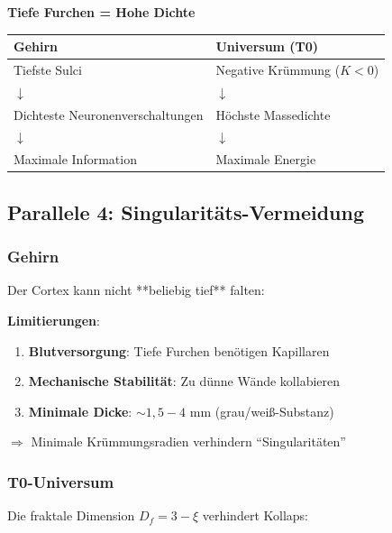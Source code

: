 	\begin{keyresult}
		\textbf{Tiefe Furchen = Hohe Dichte}
		
		\vspace{0.3cm}
		
		\begin{center}
			\begin{tabular}{p{4cm}|p{4cm}}
				\toprule
				\textbf{Gehirn} & \textbf{Universum (T0)} \\
				\midrule
				Tiefste Sulci & Negative Krümmung ($K<0$) \\
				$\downarrow$ & $\downarrow$ \\
				Dichteste Neuronenverschaltungen & Höchste Massedichte \\
				$\downarrow$ & $\downarrow$ \\
				Maximale Information & Maximale Energie \\
				\bottomrule
			\end{tabular}
		\end{center}
	\end{keyresult}
	
	\subsection{Parallele 4: Singularitäts-Vermeidung}
	
	\subsubsection{Gehirn}
	
	Der Cortex kann nicht **beliebig tief** falten:
	
	\textbf{Limitierungen}:
	\begin{enumerate}
		\item \textbf{Blutversorgung}: Tiefe Furchen benötigen Kapillaren
		\item \textbf{Mechanische Stabilität}: Zu dünne Wände kollabieren
		\item \textbf{Minimale Dicke}: $\sim 1,5 - 4$ mm (grau/weiß-Substanz)
	\end{enumerate}
	
	$\Rightarrow$ Minimale Krümmungsradien verhindern \enquote{Singularitäten}
	
	\subsubsection{T0-Universum}
	
	Die fraktale Dimension $D_f = 3 - \xi$ verhindert Kollaps:
	
